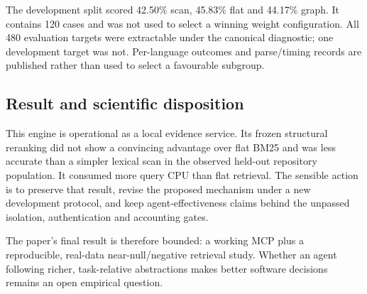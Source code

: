 \documentclass[11pt]{article}
\begin{document}
The development split scored 42.50\% scan, 45.83\% flat and 44.17\% graph. It contains 120 cases and was not used to select a winning weight configuration. All 480 evaluation targets were extractable under the canonical diagnostic; one development target was not. Per-language outcomes and parse/timing records are published rather than used to select a favourable subgroup.

\subsection{Result and scientific disposition}
This engine is operational as a local evidence service. Its frozen structural reranking did not show a convincing advantage over flat BM25 and was less accurate than a simpler lexical scan in the observed held-out repository population. It consumed more query CPU than flat retrieval. The sensible action is to preserve that result, revise the proposed mechanism under a new development protocol, and keep agent-effectiveness claims behind the unpassed isolation, authentication and accounting gates.

The paper's final result is therefore bounded: a working MCP plus a reproducible, real-data near-null/negative retrieval study. Whether an agent following richer, task-relative abstractions makes better software decisions remains an open empirical question.
\end{document}
